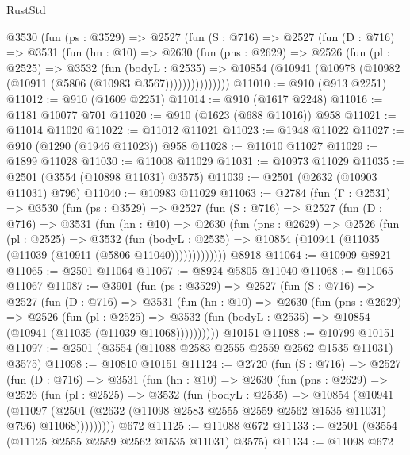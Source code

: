 \begin{lexlean}{RustStd}
\begin{coremodule}
{\begin{coremodule}
{{{{{{{{{{{{{{{{{{{{      @3530
        (fun (ps : @3529) =>
        @2527
          (fun (S : @716) =>
          @2527
            (fun (D : @716) =>
            @3531
              (fun (hn : @10) =>
              @2630
                (fun (pns : @2629) =>
                @2526
                  (fun (pl : @2525) =>
                  @3532
                    (fun (bodyL : @2535) =>
                    @10854 (@10941 (@10978 (@10982 (@10911 (@5806 (@10983 @3567)))))))))))))))
@11010 := @910 (@913 @2251)
@11012 := @910 (@1609 @2251)
@11014 := @910 (@1617 @2248)
@11016 := @1181 @10077 @701
@11020 := @910 (@1623 (@688 @11016)) @958
@11021 := @11014 @11020
@11022 := @11012 @11021
@11023 := @1948 @11022
@11027 := @910 (@1290 (@1946 @11023)) @958
@11028 := @11010 @11027
@11029 := @1899 @11028
@11030 := @11008 @11029
@11031 := @10973 @11029
@11035 := @2501 (@3554 (@10898 @11031) @3575)
@11039 := @2501 (@2632 (@10903 @11031) @796)
@11040 := @10983 @11029
@11063 := @2784
    (fun (Γ : @2531) =>
    @3530
      (fun (ps : @3529) =>
      @2527
        (fun (S : @716) =>
        @2527
          (fun (D : @716) =>
          @3531
            (fun (hn : @10) =>
            @2630
              (fun (pns : @2629) =>
              @2526
                (fun (pl : @2525) =>
                @3532
                  (fun (bodyL : @2535) =>
                  @10854 (@10941 (@11035 (@11039 (@10911 (@5806 @11040)))))))))))))
    @8918
@11064 := @10909 @8921
@11065 := @2501 @11064
@11067 := @8924 @5805 @11040
@11068 := @11065 @11067
@11087 := @3901
    (fun (ps : @3529) =>
    @2527
      (fun (S : @716) =>
      @2527
        (fun (D : @716) =>
        @3531
          (fun (hn : @10) =>
          @2630
            (fun (pns : @2629) =>
            @2526
              (fun (pl : @2525) =>
              @3532 (fun (bodyL : @2535) => @10854 (@10941 (@11035 (@11039 @11068))))))))))
    @10151
@11088 := @10799 @10151
@11097 := @2501 (@3554 (@11088 @2583 @2555 @2559 @2562 @1535 @11031) @3575)
@11098 := @10810 @10151
@11124 := @2720
    (fun (S : @716) =>
    @2527
      (fun (D : @716) =>
      @3531
        (fun (hn : @10) =>
        @2630
          (fun (pns : @2629) =>
          @2526
            (fun (pl : @2525) =>
            @3532
              (fun (bodyL : @2535) =>
              @10854
                (@10941
                  (@11097
                    (@2501
                      (@2632 (@11098 @2583 @2555 @2559 @2562 @1535 @11031) @796)
                      @11068)))))))))
    @672
@11125 := @11088 @672
@11133 := @2501 (@3554 (@11125 @2555 @2559 @2562 @1535 @11031) @3575)
@11134 := @11098 @672
}}}}}}}}}}}}}}}}}}}}
\end{coremodule}}
\end{coremodule}
\end{lexlean}
